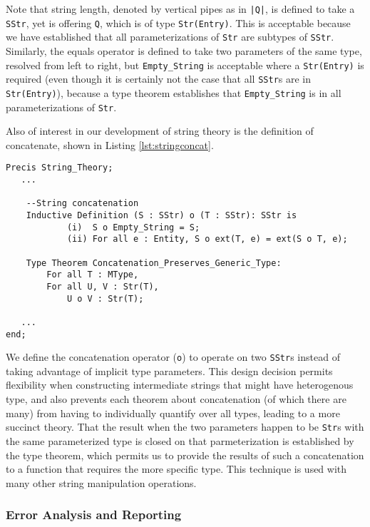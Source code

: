 Note that string length, denoted by vertical pipes as in \texttt{|Q|}, is defined to take a \texttt{SStr}, yet is offering \texttt{Q}, which is of type \texttt{Str(Entry)}.  This is acceptable because we have established that all parameterizations of \texttt{Str} are subtypes of \texttt{SStr}.  Similarly, the equals operator is defined to take two parameters of the same type, resolved from left to right, but \texttt{Empty\_String} is acceptable where a \texttt{Str(Entry)} is required (even though it is certainly not the case that all \texttt{SStr}s are in \texttt{Str(Entry)}), because a type theorem establishes that \texttt{Empty\_String} is in all parameterizations of \texttt{Str}.

Also of interest in our development of string theory is the definition of concatenate, shown in Listing \ref{lst:stringconcat}.

\begin{lstlisting}[float=h,language=resolve,caption={String concatenation and an associated type theorem\label{lst:stringconcat}}]
Precis String_Theory;
   ...

	--String concatenation
	Inductive Definition (S : SStr) o (T : SStr): SStr is
        	(i)  S o Empty_String = S;
        	(ii) For all e : Entity, S o ext(T, e) = ext(S o T, e);

	Type Theorem Concatenation_Preserves_Generic_Type:
		For all T : MType,
		For all U, V : Str(T),
			U o V : Str(T);

   ...
end;
\end{lstlisting}

We define the concatenation operator (\texttt{o}) to operate on two \texttt{SStr}s instead of taking advantage of implicit type parameters.  This design decision permits flexibility when constructing intermediate strings that might have heterogenous type, and also prevents each theorem about concatenation (of which there are many) from having to individually quantify over all types, leading to a more succinct theory.  That the result when the two parameters happen to be \texttt{Str}s with the same parameterized type is closed on that parmeterization is established by the type theorem, which permits us to provide the results of such a concatenation to a function that requires the more specific type.  This technique is used with many other string manipulation operations.

		\subsubsection{Error Analysis and Reporting}	

